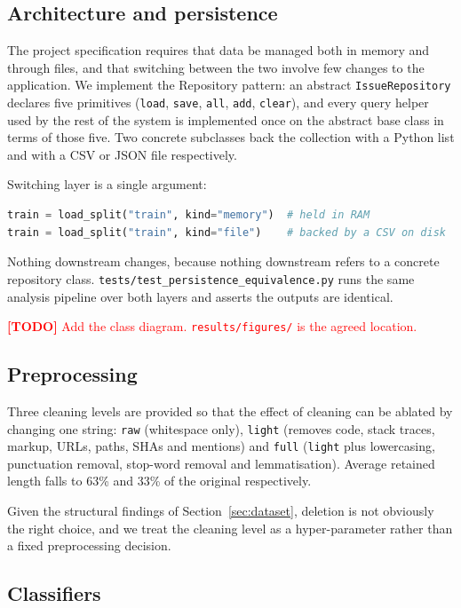 \documentclass[10pt,a4paper]{article}
\newcommand{\todoitem}[1]{\textcolor{red}{\textbf{[TODO]} #1}}
\begin{document}
\subsection{Architecture and persistence}
\label{sec:architecture}

The project specification requires that data be managed both in memory and
through files, and that switching between the two involve few changes to the
application. We implement the Repository pattern: an abstract
\texttt{IssueRepository} declares five primitives (\texttt{load}, \texttt{save},
\texttt{all}, \texttt{add}, \texttt{clear}), and every query helper used by the
rest of the system is implemented once on the abstract base class in terms of
those five. Two concrete subclasses back the collection with a Python list and
with a CSV or JSON file respectively.

Switching layer is a single argument:

\begin{lstlisting}[language=Python]
train = load_split("train", kind="memory")  # held in RAM
train = load_split("train", kind="file")    # backed by a CSV on disk
\end{lstlisting}

Nothing downstream changes, because nothing downstream refers to a concrete
repository class. \texttt{tests/test\_persistence\_equivalence.py} runs the same
analysis pipeline over both layers and asserts the outputs are identical.

\todoitem{Add the class diagram. \texttt{results/figures/} is the agreed
location.}

\subsection{Preprocessing}

Three cleaning levels are provided so that the effect of cleaning can be
ablated by changing one string: \texttt{raw} (whitespace only), \texttt{light}
(removes code, stack traces, markup, URLs, paths, SHAs and mentions) and
\texttt{full} (\texttt{light} plus lowercasing, punctuation removal, stop-word
removal and lemmatisation). Average retained length falls to 63\% and 33\% of
the original respectively.

Given the structural findings of Section~\ref{sec:dataset}, deletion is not
obviously the right choice, and we treat the cleaning level as a
hyper-parameter rather than a fixed preprocessing decision.

\subsection{Classifiers}
\label{sec:models}
\end{document}
